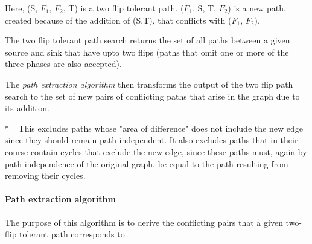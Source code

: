 \documentclass{article}
\begin{document}
\begin{center}
\end{center}
Here, (S, $F_1$, $F_2$, T) is a two flip tolerant path. ($F_1$, S, T, $F_2$) is a new path, created because of the addition of (S,T), that conflicts with ($F_1$, $F_2$).

The two flip tolerant path search returns the set of all paths between a given source and sink that have upto two flips (paths that omit one or more of the three phases are also accepted).

The \textit{path extraction algorithm} then transforms the output of the two flip path search to the set of new pairs of conflicting paths that arise in the graph due to its addition.

*= This excludes paths whose "area of difference" does not include the new edge since they should remain path independent. It also excludes paths that in their course contain cycles that exclude the new edge, since these paths must, again by path independence of the original graph, be equal to the path resulting from removing their cycles.

\paragraph{Path extraction algorithm}
The purpose of this algorithm is to derive the conflicting pairs that a given two-flip tolerant path corresponds to.
\end{document}
